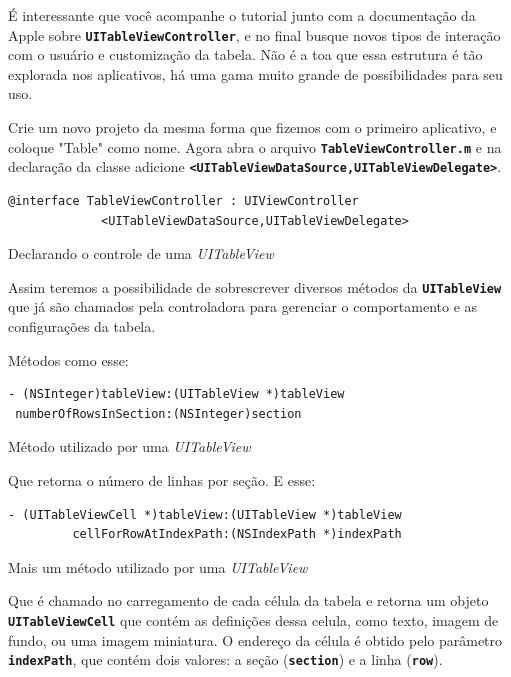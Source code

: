 \documentclass[a4paper,12pt,brazil,oneside]{book}
\begin{document}
É interessante que você acompanhe o tutorial junto com a documentação da Apple sobre \texttt{\textbf{UITableViewController}}, e no final busque novos tipos de interação com o usuário e customização da tabela. Não é a toa que essa estrutura é tão explorada nos aplicativos, há uma gama muito grande de possibilidades para seu uso.

Crie um novo projeto da mesma forma que fizemos com o primeiro aplicativo, e coloque "Table" como nome. Agora abra o arquivo \texttt{\textbf{TableViewController.m}} e na declaração da classe adicione \texttt{\textbf{<UITableViewDataSource,UITableViewDelegate>}}.

\begin{listing}[H]
\begin{verbatim}
@interface TableViewController : UIViewController
             <UITableViewDataSource,UITableViewDelegate>
\end{verbatim}
\caption{Declarando o controle de uma \emph{UITableView}}
\end{listing}


Assim teremos a possibilidade de sobrescrever diversos métodos da \texttt{\textbf{UITableView}} que já são chamados pela controladora para gerenciar o comportamento e as configurações da tabela.

Métodos como esse:

\begin{listing}
\begin{verbatim}
- (NSInteger)tableView:(UITableView *)tableView
 numberOfRowsInSection:(NSInteger)section
\end{verbatim}
\caption{Método utilizado por uma \emph{UITableView}}
\end{listing}


Que retorna o número de linhas por seção. E esse:

\begin{listing}
\begin{verbatim}
- (UITableViewCell *)tableView:(UITableView *)tableView
         cellForRowAtIndexPath:(NSIndexPath *)indexPath
\end{verbatim}
\caption{Mais um método utilizado por uma \emph{UITableView}}
\end{listing}


Que é chamado no carregamento de cada célula da tabela e retorna um objeto \texttt{\textbf{UITableViewCell}} que contém as definições dessa celula, como texto, imagem de fundo, ou uma imagem miniatura. O endereço da célula é obtido pelo parâmetro \texttt{\textbf{indexPath}}, que contém dois valores: a seção (\texttt{\textbf{section}}) e a linha (\texttt{\textbf{row}}).
\end{document}
